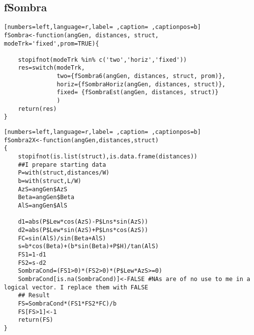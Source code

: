 \subsection{fSombra}
\label{sec:org93b1ddf}
\begin{lstlisting}[numbers=left,language=r,label= ,caption= ,captionpos=b]
fSombra<-function(angGen, distances, struct, modeTrk='fixed',prom=TRUE){

    stopifnot(modeTrk %in% c('two','horiz','fixed'))
    res=switch(modeTrk, 
               two={fSombra6(angGen, distances, struct, prom)},
               horiz={fSombraHoriz(angGen, distances, struct)},
               fixed= {fSombraEst(angGen, distances, struct)}
               )
    return(res)
}
\end{lstlisting}
\begin{lstlisting}[numbers=left,language=r,label= ,caption= ,captionpos=b]
fSombra2X<-function(angGen,distances,struct)
{
    stopifnot(is.list(struct),is.data.frame(distances))
    ##I prepare starting data	
    P=with(struct,distances/W)
    b=with(struct,L/W)
    AzS=angGen$AzS
    Beta=angGen$Beta
    AlS=angGen$AlS

    d1=abs(P$Lew*cos(AzS)-P$Lns*sin(AzS))
    d2=abs(P$Lew*sin(AzS)+P$Lns*cos(AzS))
    FC=sin(AlS)/sin(Beta+AlS)
    s=b*cos(Beta)+(b*sin(Beta)+P$H)/tan(AlS)
    FS1=1-d1
    FS2=s-d2
    SombraCond=(FS1>0)*(FS2>0)*(P$Lew*AzS>=0)
    SombraCond[is.na(SombraCond)]<-FALSE #NAs are of no use to me in a logical vector. I replace them with FALSE
    ## Result
    FS=SombraCond*(FS1*FS2*FC)/b
    FS[FS>1]<-1
    return(FS)
}	
\end{lstlisting}
